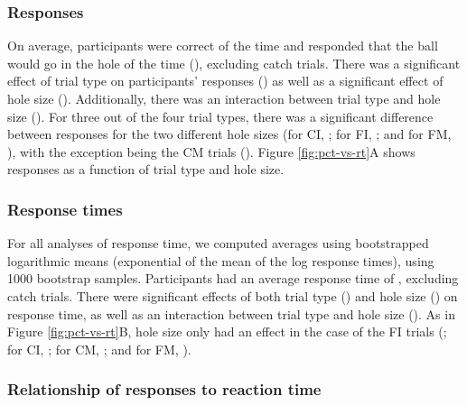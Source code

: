 \documentclass[10pt,letterpaper]{article}
\begin{document}
\subsubsection{Responses}

On average, participants were correct \AvgCorrect{} of the time and responded that the ball would go in the hole \AvgResponse{} of the time (\ResponseN{}), excluding catch trials.
There was a significant effect of trial type on participants' responses (\ResponseHoleClass{}) as well as a significant effect of hole size (\ResponseHoleSize{}).
Additionally, there was an interaction between trial type and hole size (\ResponseFull{}).
For three out of the four trial types, there was a significant difference between responses for the two different hole sizes (for CI, \ResponseCIttest{}; for FI, \ResponseCIttest{}; and for FM, \ResponseFMttest{}), with the exception being the CM trials (\ResponseCMttest{}).
Figure \ref{fig:pct-vs-rt}A shows responses as a function of trial type and hole size.

\subsubsection{Response times}

For all analyses of response time, we computed averages using bootstrapped logarithmic means (exponential of the mean of the log response times), using 1000 bootstrap samples.
Participants had an average response time of \AvgRT{}, excluding catch trials.
There were significant effects of both trial type (\RTHoleClass{}) and hole size (\RTHoleSize{}) on response time, as well as an interaction between trial type and hole size (\RTFull{}).
As in Figure \ref{fig:pct-vs-rt}B, hole size only had an effect in the case of the FI trials (\ResponsetimeFIttest{}; for CI, \ResponsetimeCIttest{}; for CM, \ResponsetimeCMttest{}; and for FM, \ResponsetimeFMttest{}).

\subsubsection{Relationship of responses to reaction time}
\end{document}
